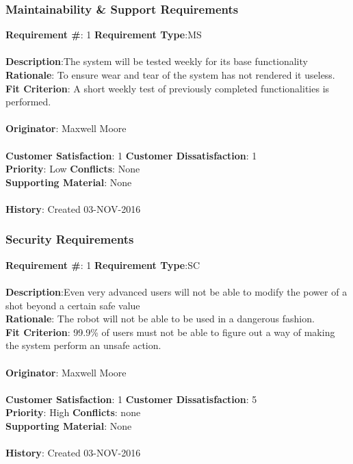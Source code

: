 \documentclass[titlepage]{article}
\begin{document}
\subsubsection{Maintainability \& Support Requirements}
\begin{framed}
	\noindent\textbf{Requirement \#}: 1 \hfill \textbf{Requirement Type}:MS \hfill\\\\
	\noindent\textbf{Description}:The system will be tested weekly for its base functionality\\
	\textbf{Rationale}: To ensure wear and tear of the system has not rendered it useless.\\
	\textbf{Fit Criterion}: A short weekly test of previously completed functionalities is performed.\\\\
	\textbf{Originator}: Maxwell Moore\\\\
	\noindent\textbf{Customer Satisfaction}: 1 \hfill 	\textbf{Customer Dissatisfaction}: 1 \hfill\\
	\textbf{Priority}: Low \hfill \textbf{Conflicts}: None \hfill\\
	\textbf{Supporting Material}: None\\\\
	\noindent\textbf{History}: Created 03-NOV-2016
\end{framed}


\subsubsection{Security Requirements}
\begin{framed}
	\noindent\textbf{Requirement \#}: 1 \hfill \textbf{Requirement Type}:SC \hfill\\\\
	\noindent\textbf{Description}:Even very advanced users will not be able to modify the power of a shot beyond a certain safe value\\
	\textbf{Rationale}: The robot will not be able to be used in a dangerous fashion.\\
	\textbf{Fit Criterion}: 99.9\% of users must not be able to figure out a way of making the system perform an unsafe action.\\\\
	\textbf{Originator}: Maxwell Moore\\\\
	\noindent\textbf{Customer Satisfaction}: 1 \hfill 	\textbf{Customer Dissatisfaction}: 5 \hfill\\
	\textbf{Priority}: High \hfill \textbf{Conflicts}: none \hfill\\
	\textbf{Supporting Material}: None\\\\
	\noindent\textbf{History}: Created 03-NOV-2016
\end{framed}
\end{document}

